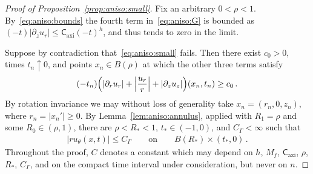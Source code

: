 \documentclass[11pt,reqno]{amsproc}
\numberwithin{equation}{section}
\theoremstyle{remark}
\newcommand{\p}{\partial}
\newcommand{\Caxi}{\mathsf{C}_{\mathrm{axi}}}
\begin{document}
\begin{proof}[Proof of Proposition~\ref{prop:aniso:small}]
Fix an arbitrary $0<\rho<1$. By~\eqref{eq:aniso:bounds} the fourth term in~\eqref{eq:aniso:G} is bounded as $(-t)|\p_zu_r|\le\Caxi(-t)^h$, and thus tends to zero in the limit.

Suppose by contradiction that~\eqref{eq:aniso:small} fails. Then there exist $c_0>0$, times $t_n\uparrow0$, and points $x_n\in B(\rho)$ at which the other three terms satisfy
\begin{align}
(-t_n)\Bigl(|\p_ru_r|+\Bigl|\frac{u_r}{r}\Bigr|+|\p_zu_z|\Bigr)(x_n,t_n)\ge c_0
\,.
\label{eq:aniso:zoom:selected}
\end{align}
By rotation invariance we may without loss of generality take $x_n=(r_n,0,z_n)$, where $r_n = |x_n'|\geq 0$. By Lemma~\ref{lem:aniso:annulus}, applied with $R_1=\rho$ and some $R_0\in(\rho,1)$, there are $\rho<R_*<1$, $t_*\in(-1,0)$, and $C_\Gamma<\infty$ such that
\begin{align}
|ru_\theta(x,t)|\le C_\Gamma
\qquad\mbox{on}\qquad B(R_*)\times(t_*,0)
\,.
\label{eq:aniso:zoom:circulation}
\end{align}
Throughout the proof, $C$ denotes a constant which may depend on $h$, $M_f$, $\Caxi$, $\rho$, $R_*$, $C_\Gamma$, and on the compact time interval under consideration, but never on $n$.


\end{proof}
\end{document}
